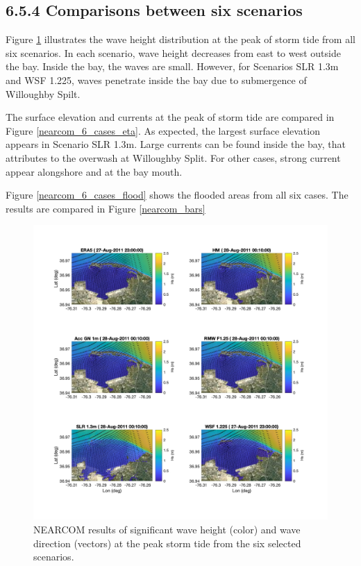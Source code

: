 \documentclass[11pt]{article}
\begin{document}
\subsection*{6.5.4 Comparisons between six scenarios}
Figure \ref{nearcom_6_cases_hs} illustrates the wave height distribution at the peak of storm tide from all six scenarios. In each scenario, wave height decreases from east to west outside the bay. Inside the bay, the waves are small. However, for Scenarios SLR 1.3m and WSF 1.225, waves penetrate inside the bay due to submergence of  Willoughby Spilt. 

The surface elevation and currents at the peak of storm tide are compared in Figure \ref{nearcom_6_cases_eta}. As expected, the largest surface elevation appears in Scenario SLR 1.3m. Large currents can be found inside the bay, that attributes to the overwash at Willoughby Split. For other cases, strong current appear alongshore and at the bay mouth. 

Figure \ref{nearcom_6_cases_flood} shows the flooded areas from all six cases. The results are compared in Figure \ref{nearcom_bars}

\begin{figure}[h!]
\centering
\includegraphics[width=\textwidth]{./figures/nearcom_hs.jpg}
\caption{NEARCOM results of significant wave height (color) and wave direction (vectors) at the peak storm tide from the six selected scenarios.}
\label{nearcom_6_cases_hs}
\centering
\end{figure}
\end{document}
